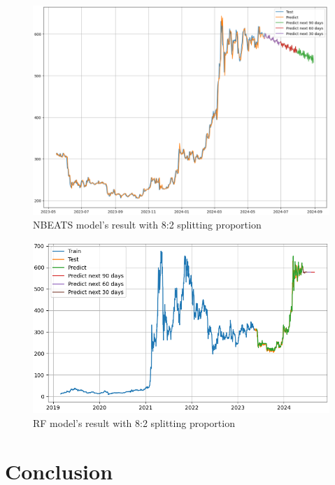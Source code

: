 \documentclass{ieeeojies}
\begin{document}
\begin{figure}[H]
	\centering
	\begin{minipage}{0.6\linewidth}
		\centering
		\includegraphics[width=\linewidth]{bibliography/Images/NBEATS_BNB_82.PNG}
		\caption{NBEATS model's result with 8:2 splitting proportion}
	\end{minipage}
\end{figure}
\begin{figure}[H]
	\centering
	\begin{minipage}{0.6\linewidth}
		\centering
		\includegraphics[width=\linewidth]{bibliography/Images/RF_BNB_82.PNG}
		\caption{RF model's result with 8:2 splitting proportion}
	\end{minipage}
\end{figure}

\section{Conclusion}
\end{document}
